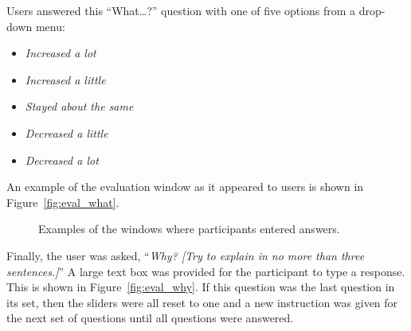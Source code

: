 Users answered this ``What\ldots?'' question with one of five options from a drop-down menu:
\begin{itemize}
\item \textit{Increased a lot}
\item \textit{Increased a little}
\item \textit{Stayed about the same}
\item \textit{Decreased a little}
\item \textit{Decreased a lot}
\end{itemize}
An example of the evaluation window as it appeared to users is shown in Figure~\ref{fig:eval_what}.




\begin{figure}
\centering


	\caption[Examples of the windows where participants entered answers]{Examples of the windows where participants entered answers.}
	\label{fig:eval}
\end{figure}

Finally, the user was asked, ``\textit{Why? [Try to explain in no more than three sentences.]}''  A large text box was provided for the participant to type a response.  This is shown in Figure~\ref{fig:eval_why}. If this question was the last question in its set, then the sliders were all reset to one and a new instruction was given for the next set of questions until all questions were answered. 


